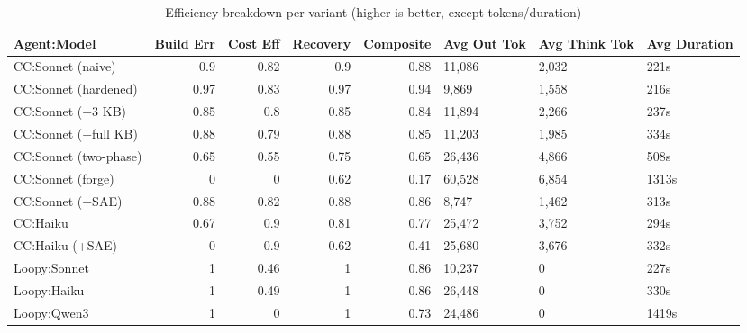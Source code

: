 \begin{table}[t]
\centering
\caption{Efficiency breakdown per variant (higher is better, except tokens/duration)}
\label{tab:efficiency-breakdown}
\small
\begin{tabular}{lrrrrlll}
\toprule
 Agent:Model           &   Build Err &   Cost Eff &   Recovery &   Composite & Avg Out Tok   & Avg Think Tok   & Avg Duration   \\
\midrule
 CC:Sonnet (naive)     &        0.9  &       0.82 &       0.9  &        0.88 & 11,086        & 2,032           & 221s           \\
 CC:Sonnet (hardened)  &        0.97 &       0.83 &       0.97 &        0.94 & 9,869         & 1,558           & 216s           \\
 CC:Sonnet (+3 KB)     &        0.85 &       0.8  &       0.85 &        0.84 & 11,894        & 2,266           & 237s           \\
 CC:Sonnet (+full KB)  &        0.88 &       0.79 &       0.88 &        0.85 & 11,203        & 1,985           & 334s           \\
 CC:Sonnet (two-phase) &        0.65 &       0.55 &       0.75 &        0.65 & 26,436        & 4,866           & 508s           \\
 CC:Sonnet (forge)     &        0    &       0    &       0.62 &        0.17 & 60,528        & 6,854           & 1313s          \\
 CC:Sonnet (+SAE)      &        0.88 &       0.82 &       0.88 &        0.86 & 8,747         & 1,462           & 313s           \\
 CC:Haiku              &        0.67 &       0.9  &       0.81 &        0.77 & 25,472        & 3,752           & 294s           \\
 CC:Haiku (+SAE)       &        0    &       0.9  &       0.62 &        0.41 & 25,680        & 3,676           & 332s           \\
 Loopy:Sonnet          &        1    &       0.46 &       1    &        0.86 & 10,237        & 0               & 227s           \\
 Loopy:Haiku           &        1    &       0.49 &       1    &        0.86 & 26,448        & 0               & 330s           \\
 Loopy:Qwen3           &        1    &       0    &       1    &        0.73 & 24,486        & 0               & 1419s          \\
\bottomrule
\end{tabular}
\end{table}
